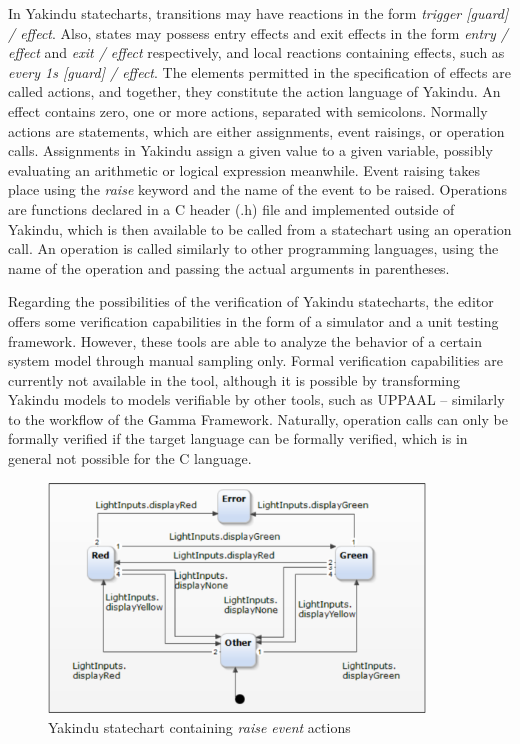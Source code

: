 In Yakindu statecharts, transitions may have reactions in the form \textit{trigger [guard] / effect}. Also, states may possess entry effects and exit effects in the form \textit{entry / effect} and \textit{exit / effect} respectively, and local reactions containing effects, such as \textit{every 1s [guard] / effect}. The elements permitted in the specification of effects are called actions, and together, they constitute the action language of Yakindu. 
An effect contains zero, one or more actions, separated with semicolons. Normally actions are statements, which are either assignments, event raisings, or operation calls. Assignments in Yakindu assign a given value to a given variable, possibly evaluating an arithmetic or logical expression meanwhile. Event raising takes place using the \textit{raise} keyword and the name of the event to be raised. Operations are functions declared in a C header (.h) file and implemented outside of Yakindu, which is then available to be called from a statechart using an operation call. An operation is called similarly to other programming languages, using the name of the operation and passing the actual arguments in parentheses.

Regarding the possibilities of the verification of Yakindu statecharts, the editor offers some verification capabilities in the form of a simulator and a unit testing framework. However, these tools are able to analyze the behavior of a certain system model through manual sampling only. Formal verification capabilities are currently not available in the tool, although it is possible by transforming Yakindu models to models verifiable by other tools, such as UPPAAL -- similarly to the workflow of the Gamma Framework. Naturally, operation calls can only be formally verified if the target language can be formally verified, which is in general not possible for the C language.

\begin{figure}[ht]
	\centering
	\includegraphics[width=100mm, keepaspectratio]{figures/YakinduAction.png}
	\caption{Yakindu statechart containing \textit{raise event} actions}
	\label{fig:YakinduExample}
\end{figure}

